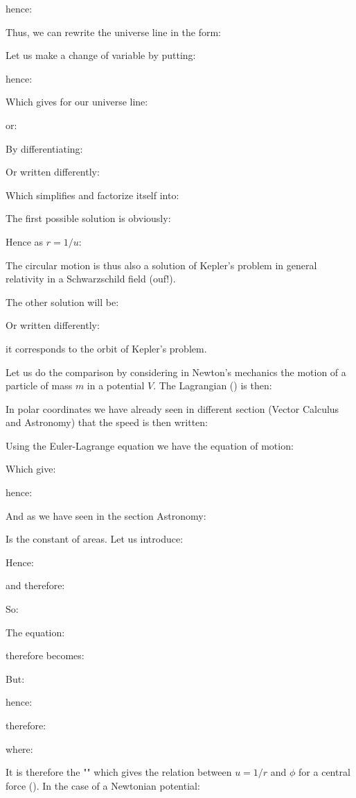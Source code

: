 	hence:
	
	Thus, we can rewrite the universe line in the form:
	
	Let us make a change of variable by putting:
	
	hence:
	
	Which gives for our universe line:
	
	or:
	
	By differentiating:
	
	Or written differently:
	
	Which simplifies and factorize itself into:
	
	The first possible solution is obviously:
	
	Hence as $r=1/u$:
	
	The circular motion is thus also a solution of Kepler's problem in general relativity in a Schwarzschild field (ouf!).

	The other solution will be:
	
	Or written differently:
	
	it corresponds to the orbit of Kepler's problem.

	Let us do the comparison by considering in Newton's mechanics the motion of a particle of mass $m$ in a potential $V$. The Lagrangian () is then:
	
	In polar coordinates we have already seen in different section (Vector Calculus and Astronomy) that the speed is then written:
	
	Using the Euler-Lagrange equation we have the equation of motion:
	
	Which give:
	
	hence:
	
	And as we have seen in the section Astronomy:
	
	Is the constant of areas. Let us introduce:
	
	Hence:
	
	and therefore:
	
	So:
	
	The equation:
	
	therefore becomes:
	
	But:
	
	hence:
	
	therefore:
	
	where:
	
	It is therefore the "" which gives the relation between $u = 1 / r$ and $\phi$ for a central force (). In the case of a Newtonian potential:
	
